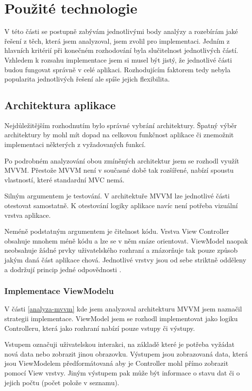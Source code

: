 \section{Použité technologie}

V této části se postupně zabývám jednotlivými body analýzy a rozebírám jaké řešení z těch, která jsem analyzoval, jsem zvolil pro implementaci.
Jedním z hlavních kritérií při konečném rozhodování byla slučitelnost jednotlivých částí.
Vzhledem k rozsahu implementace jsem si musel být jistý, že jednotlivé části budou fungovat správně v celé aplikaci.
Rozhodujícím faktorem tedy nebyla popularita jednotlivých řešení ale spíše jejich flexibilita.

\subsection{Architektura aplikace}\label{technologie-architektura}

Nejdůležitějším rozhodnutím bylo správné vybrání architektury.
Špatný výběr architektury by mohl mít dopad na celkovou funkčnost aplikace či znemožnit implementaci některých z vyžadovaných funkcí.

Po podrobném analyzování obou zmíněných architektur jsem se rozhodl využít MVVM.
Přestože MVVM není v současné době tak rozšířené, nabízí spoustu vlastností, které standardní MVC nemá.

Silným argumentem je testování.
V architektuře MVVM lze jednotlivé části otestovat samostatně.
K otestování logiky aplikace navíc není potřeba vizuální vrstva aplikace.

Neméně podstatným argumentem je čitelnost kódu.
Vrstva View Controller obsahuje mnohem méně kódu a lze se v něm snáze orientovat.
ViewModel naopak neobsahuje žádné prvky uživatelského rozhraní a znázorňuje tak pouze způsob jakým daná část aplikace chová.
Jednotlivé vrstvy jsou od sebe striktně odděleny a dodržují princip jedné odpovědnosti \cite{toptal-srp}.

\subsubsection*{Implementace ViewModelu}

V části \ref{analyza-mvvm} kde jsem analyzoval architekturu MVVM jsem naznačil strategii implementace.
ViewModel jsem se rozhodl implementovat jako logiku Controlleru, která jako rozhraní nabízí pouze vstupy či výstupy.

Vstupem označuji uživatelskou interakci, na základě které je potřeba vyžádat nová data nebo zobrazit jinou obrazovku.
Výstupem jsou zobrazovaná data, která jsou ViewModelem předformátovaná aby je Controller mohl přímo zobrazit pomocí View vrstvy.
Jiným výstupem pak může být informace o stavu dat či o jejich počtu (počet polože v seznamu).

